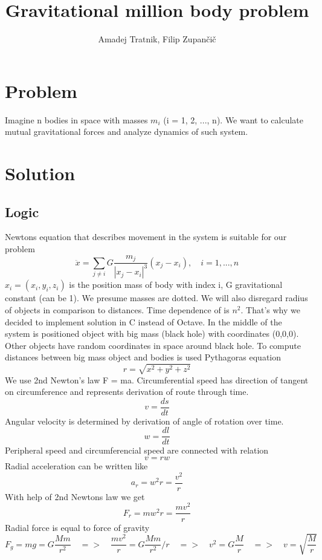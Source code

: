 \documentclass[A4]{article}
\begin{document}
\title{Gravitational million body problem}
\author{Amadej Tratnik, Filip Zupančič}
\maketitle
\section{Problem}
Imagine n bodies in space with masses $m_i$ (i = 1, 2, ..., n). We want to calculate mutual gravitational forces and analyze dynamics of such system. 
\section{Solution}
\subsection{Logic}
Newtons equation that describes movement in the system is suitable for our problem
\[
\ddot{x} = \sum_{j \neq i} G \frac{m_j}{|x_j - x_i|^3}(x_j - x_i), \quad i = 1, . . . , n
\]
\newline
$x_i = (x_i, y_i, z_i)$ is the position mass of body with index i, G gravitational constant (can be 1). We presume masses are dotted. We will also disregard radius of objects in comparison to distances. 
\newline
Time dependence of is $n^2$. That's why we decided to implement solution in C instead of Octave. 
\newline
In the middle of the system is positioned object with big mass (black hole) with coordinates (0,0,0). Other objects have random coordinates in space around black hole. To compute distances between big mass object and bodies is used Pythagoras equation
\[
r = \sqrt{x^2 + y^2 + z^2}
\]
\newline
We use 2nd Newton's law F = ma. Circumferential speed has direction of tangent on circumference and represents derivation of route through time. 
\[
v = \frac{ds}{dt}
\]
\newline
Angular velocity is determined by derivation of angle of rotation over time.
\[
w = \frac{dl}{dt}
\]
Peripheral speed and circumferencial speed are connected with relation 
\[
v = rw
\]
Radial acceleration can be written like 
\[
a_r = w^2r = \frac{v^2}{r}
\]
With help of 2nd Newtons law we get 
\[
F_r = mw^2r = \frac{mv^2}{r}
\] 
Radial force is equal to force of gravity 
\[
F_g = mg = G\frac{Mm}{r^2} \quad => \quad \frac{mv^2}{r} = G\frac{Mm}{r^2}/r \quad => \quad v^2 = G\frac{M}{r} \quad => \quad v = \sqrt{\frac{M}{r}} 
\]
\end{document}
